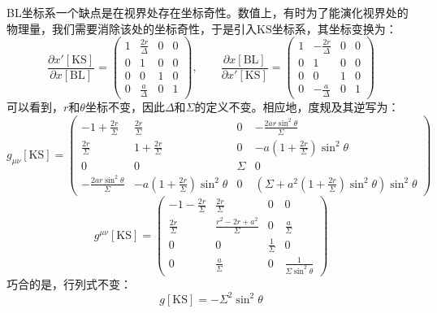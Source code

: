 \documentclass[lang=cn,color=blue,cm,11pt,scheme=chinese,bibend=bibtex,sorting=nty]{elegantbook}
\begin{document}
	\begin{note}
		BL坐标系一个缺点是在视界处存在坐标奇性。数值上，有时为了能演化视界处的物理量，我们需要消除该处的坐标奇性，于是引入KS坐标系，其坐标变换为：
		\begin{equation}
			\frac{\partial x'[\text{KS}]}{\partial x [\text{BL}]} = \begin{pmatrix}
				1 & \frac{2 r}{\Delta} & 0 & 0 \\
				0 & 1 & 0 & 0 \\
				0 & 0 & 1 & 0 \\
				0 & \frac{a}{\Delta} & 0 & 1
			\end{pmatrix}, \qquad \frac{\partial x [\text{BL}]}{\partial x' [\text{KS}]} = \begin{pmatrix}
				1 & - \frac{2 r}{\Delta} & 0 & 0 \\
				0 & 1 & 0 & 0 \\
				0 & 0 & 1 & 0 \\
				0 & - \frac{a}{\Delta} & 0 & 1
			\end{pmatrix}
		\end{equation}
		可以看到，$r$和$\theta$坐标不变，因此$\Delta$和$\Sigma$的定义不变。相应地，度规及其逆写为：
		\begin{equation}
			g_{\mu \nu} [\text{KS}] = \begin{pmatrix}
				- 1 + \frac{2 r}{\Sigma} & \frac{2 r}{\Sigma} & 0 & - \frac{2 a r \sin^2 \theta}{\Sigma}\\
				\frac{2 r}{\Sigma} & 1 + \frac{2 r}{\Sigma} & 0 & - a \left( 1 + \frac{2 r}{\Sigma} \right) \sin^2 \theta\\
				0 & 0 & \Sigma & 0\\
				- \frac{2 a r \sin^2 \theta}{\Sigma} & - a \left( 1 + \frac{2 r}{\Sigma} \right) \sin^2 \theta & 0 & \left( \Sigma + a^2 \left( 1 + \frac{2 r}{\Sigma} \right) \sin^2 \theta \right) \sin^2 \theta
			\end{pmatrix}
		\end{equation}
		\begin{equation}
			g^{\mu \nu} [\text{KS}] = \begin{pmatrix}
				- 1 - \frac{2 r}{\Sigma} & \frac{2 r}{\Sigma} & 0 & 0\\
				\frac{2 r}{\Sigma} & \frac{r^2 - 2 r + a^2}{\Sigma} & 0 & \frac{a}{\Sigma}\\
				0 & 0 &  \frac{1}{\Sigma} & 0\\
				0 & \frac{a}{\Sigma} & 0 & \frac{1}{\Sigma \sin^2 \theta}
			\end{pmatrix}
		\end{equation}
		巧合的是，行列式不变：
		\begin{equation}
			g [\text{KS}] = - \Sigma^2 \sin^2 \theta
		\end{equation}
	\end{note}
	
\end{document}
